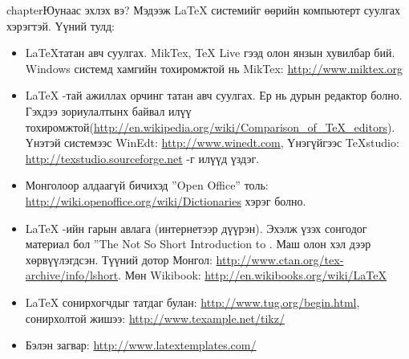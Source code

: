 chapter{Юунаас эхлэх вэ?}
\label{apdx:B}
Мэдээж \LaTeX{} системийг өөрийн компьютерт суулгах хэрэгтэй. Үүний тулд:
\begin{itemize}
	\item \LaTeX татан авч суулгах. MikTex, TeX Live гээд олон янзын хувилбар бий. Windows системд хамгийн тохиромжтой нь MikTex: \url{http://www.miktex.org}
	\item \LaTeX{} -тай ажиллах орчинг татан авч суулгах. Ер нь дурын редактор болно. Гэхдээ зориулалтынх байвал илүү тохиромжтой(\url{http://en.wikipedia.org/wiki/Comparison_of_TeX_editors}). Үнэтэй системээс WinEdt: \url{http://www.winedt.com}, Үнэгүйгээс TeXstudio: \url{http://texstudio.sourceforge.net} -г илүүд үздэг.
	\item Монголоор алдаагүй бичихэд ''Open Office'' толь: \url{http://wiki.openoffice.org/wiki/Dictionaries} хэрэг болно.
	\item \LaTeX{} -ийн гарын авлага (интернетээр дүүрэн). Эхэлж үзэх сонгодог материал бол ''The Not So Short Introduction to \LaTeXe. Маш олон хэл дээр хөрвүүлэгдсэн. Түүний дотор Монгол: \url{http://www.ctan.org/tex-archive/info/lshort}. Мөн Wikibook: \url{http://en.wikibooks.org/wiki/LaTeX}
	\item \LaTeX{} сонирхогчдыг татдаг булан: \url{http://www.tug.org/begin.html}, сонирхолтой жишээ: \url{http://www.texample.net/tikz/}
	\item Бэлэн загвар: \url{http://www.latextemplates.com/}
	 
\end{itemize}

